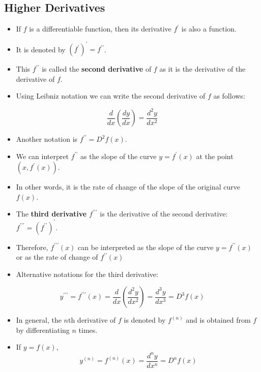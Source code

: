 \documentclass[]{book}
\begin{document}
\hypertarget{higher-derivatives}{%
\subsection{Higher Derivatives}\label{higher-derivatives}}

\begin{itemize}
\item
  If \(f\) is a differentiable function, then its derivative \(f^\prime\) is also a function.
\item
  It is denoted by \((f^\prime)^\prime = f^{\prime\prime}\).
\item
  This \(f^{\prime\prime}\) is called the \textbf{second derivative} of \(f\) as it is the derivative of the derivative of \(f\).
\item
  Using Leibniz notation we can write the second derivative of \(f\) as follows:
\end{itemize}

\[\frac{d}{dx}(\frac{dy}{dx})= \frac{d^2y}{dx^2}\]

\begin{itemize}
\item
  Another notation is \(f^{\prime\prime}= D^2f(x)\).
\item
  We can interpret \(f^{\prime\prime}\) as the slope of the curve \(y=f^{\prime}(x)\) at the point \((x, f^\prime(x))\).
\item
  In other words, it is the rate of change of the slope of the original curve \(f(x)\).
\item
  The \textbf{third derivative} \(f^{\prime\prime\prime}\) is the derivative of the second derivative: \(f^{\prime\prime\prime} = (f^{\prime\prime})^\prime\).
\item
  Therefore, \(f^{\prime\prime\prime}(x)\) can be interpreted as the slope of the curve \(y= f^{\prime\prime}(x)\) or as the rate of change of \(f^{\prime\prime}(x)\)
\item
  Alternative notations for the third derivative:
\end{itemize}

\[y^{\prime\prime\prime} = f^{\prime\prime\prime}(x)=\frac{d}{dx}(\frac{d^2y}{dx^2})= \frac{d^3y}{dx^3}= D^3f(x)\]

\begin{itemize}
\item
  In general, the \(n\)th derivative of \(f\) is denoted by \(f^{(n)}\) and is obtained from \(f\) by differentiating \(n\) times.
\item
  If \(y=f(x)\),
  \[y^{(n)} = f^{(n)}(x)= \frac{d^ny}{dx^n}= D^nf(x)\]
\end{itemize}
\end{document}
